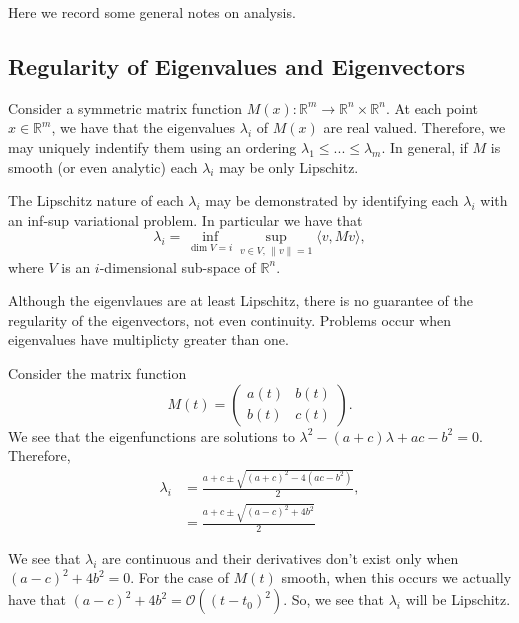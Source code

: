 Here we record some general notes on analysis.

\subsection{Regularity of Eigenvalues and Eigenvectors}\label{sub:eigen}

Consider a symmetric matrix function $M(x): \mathbb R^m \to \mathbb R^n\times \mathbb R^n$. At each point $x\in \mathbb R^m$, we have that the eigenvalues $\lambda_i$ of $M(x)$ are real valued. Therefore, we may uniquely indentify them using an ordering $\lambda_1 \leq ... \leq \lambda_m$. In general, if $M$ is smooth (or even analytic) each $\lambda_i$ may be only Lipschitz.

The Lipschitz nature of each $\lambda_i$ may be demonstrated by identifying each $\lambda_i$ with an inf-sup variational problem. In particular we have that
\begin{equation}
\lambda_i = \inf\limits_{\dim V = i} \sup\limits_{v\in V, \, \|v\| = 1} \langle v, Mv\rangle,
\end{equation}
where $V$ is an $i$-dimensional sub-space of $\mathbb R^n$.

Although the eigenvlaues are at least Lipschitz, there is no guarantee of the regularity of the eigenvectors, not even continuity. Problems occur when eigenvalues have multiplicty greater than one.

Consider the matrix function
\begin{equation}
M(t) = \begin{pmatrix}
a(t) & b(t)\\
b(t) & c(t)
\end{pmatrix}.
\end{equation}
We see that the eigenfunctions are solutions to $\lambda^2 - (a + c)\lambda + ac-b^2 = 0$. Therefore,
\begin{align}
\lambda_i & = \frac{a+c \pm \sqrt{(a+c)^2 - 4(ac - b^2)}}{2},\\
& = \frac{a+c \pm \sqrt{(a-c)^2 + 4 b^2}}{2}
\end{align}

We see that $\lambda_i$ are continuous and their derivatives don't exist only when $(a-c)^2 + 4b^2 = 0.$ For the case of $M(t)$ smooth, when this occurs we actually have that $(a-c)^2 + 4b^2 = \mathcal O((t-t_0)^2).$ So, we see that $\lambda_i$ will be Lipschitz.

